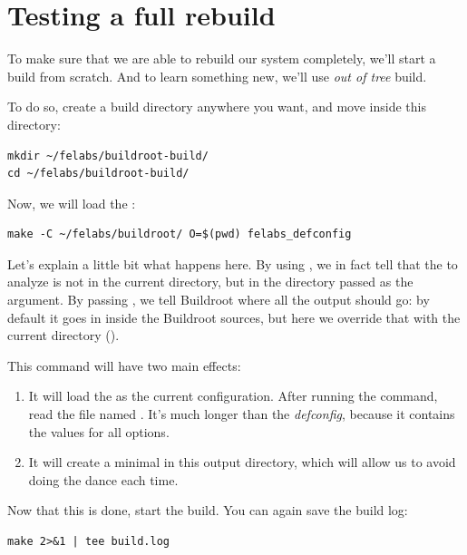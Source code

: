 \section{Testing a full rebuild}

To make sure that we are able to rebuild our system completely, we'll
start a build from scratch. And to learn something new, we'll use {\em
  out of tree} build.

To do so, create a build directory anywhere you want, and move inside
this directory:

\begin{verbatim}
mkdir ~/felabs/buildroot-build/
cd ~/felabs/buildroot-build/
\end{verbatim}

Now, we will load the :

\begin{verbatim}
make -C ~/felabs/buildroot/ O=$(pwd) felabs_defconfig
\end{verbatim}

Let's explain a little bit what happens here. By using
, we in fact tell  that the
 to analyze is not in the current directory, but in the
directory passed as the  argument. By passing , we
tell Buildroot where all the output should go: by default it goes in
 inside the Buildroot sources, but here we override that
with the current directory ().

This command will have two main effects:

\begin{enumerate}

\item It will load the  as the current
  configuration. After running the command, read the file named
  . It's much longer than the {\em defconfig}, because
  it contains the values for all options.

\item It will create a minimal  in this output
  directory, which will allow us to avoid doing the  dance each time.

\end{enumerate}

Now that this is done, start the build. You can again save the build
log:

\begin{verbatim}
make 2>&1 | tee build.log
\end{verbatim}

